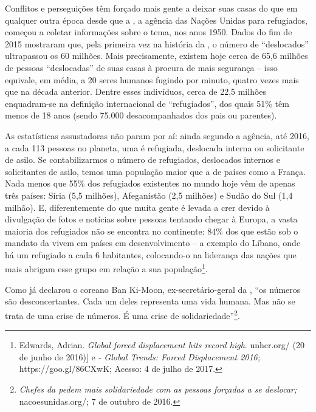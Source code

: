 

Conflitos e perseguições têm forçado mais gente a deixar suas casas do
que em qualquer outra época desde que a , a agência das Nações
Unidas para refugiados, começou a coletar informações sobre o tema, nos
anos 1950. Dados do fim de 2015 mostraram que, pela primeira vez na
história da , o número de ``deslocados'' ultrapassou os 60 milhões.
Mais precisamente, existem hoje cerca de 65,6 milhões de pessoas
``deslocadas'' de suas casas à procura de mais segurança -- isso
equivale, em média, a 20 seres humanos fugindo por minuto, quatro vezes
mais que na década anterior. Dentre esses indivíduos, cerca de 22,5 
milhões enquadram-se na definição internacional de ``refugiados'', dos
quais 51\% têm menos de 18 anos (sendo 75.000 desacompanhados dos pais
ou parentes).

As estatísticas assustadoras não param por aí: ainda segundo a agência,
até 2016, a cada 113 pessoas no planeta, uma é refugiada, deslocada
interna ou solicitante de asilo. Se contabilizarmos o número de
refugiados, deslocados internos e solicitantes de asilo, temos uma
população maior que a de países como a França. Nada menos que 55\% dos
refugiados existentes no mundo hoje vêm de apenas três países: Síria (5,5 milhões),
Afeganistão (2,5 milhões) e Sudão do Sul (1,4 milhão). E, diferentemente do que muita gente é levada a
crer devido à divulgação de fotos e notícias sobre pessoas tentando
chegar à Europa, a vasta maioria dos refugiados não se encontra no
continente: 84\% dos que estão sob o mandato da  vivem em países em
desenvolvimento -- a exemplo do Líbano, onde há um refugiado a cada 6
habitantes, colocando-o na liderança das nações que mais abrigam esse
grupo em relação a sua população\footnote{Edwards, Adrian. \emph{Global forced
  displacement hits record high}.
  {unhcr.org/} (20 de
  junho de 2016){]} e \emph{ - Global Trends: Forced Displacement 2016;}
  https://goo.gl/86CXwK; Acesso: 4 
  de julho de 2017.}. 



Como já declarou o coreano Ban Ki-Moon,
ex-secretário-geral da , ``os números são desconcertantes. Cada um
deles representa uma vida humana. Mas não se trata de uma crise de
números. É uma crise de solidariedade''\footnote{\emph{Chefes da 
  pedem mais solidariedade com as pessoas forçadas a se deslocar;}
  {nacoesunidas.org/}; 7
  de outubro de 2016.}.



